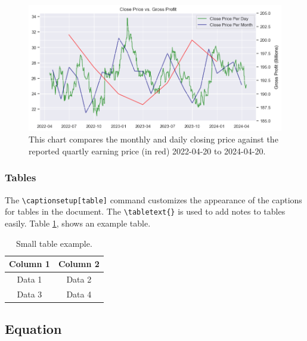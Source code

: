 \documentclass[9pt,a4paper,twoside]{tau}
\begin{document}
            \begin{figure}[H]
                \centering
                \includegraphics[width=0.85\columnwidth]{images/CloseDataVsProfit.png}
                \caption{This chart compares the monthly and daily closing price against the reported quartly earning price (in red) 2022-04-20 to 2024-04-20.}
                \label{fig:figure}
            \end{figure}



        \subsubsection{Tables}
    
            The \verb*|\captionsetup[table]| command customizes the appearance of the captions for tables in the document. The \verb*|\tabletext{}| is used to add notes to tables easily. Table \ref{tab:table}, shows an example table.
            
            \begin{table}[H]
                \centering
                \caption{Small table example.}
    		\label{tab:table}
                \begin{tabular}{cc}
            	\toprule
                    \textbf{Column 1} & \textbf{Column 2} \\
                    \midrule
                    Data 1 & Data 2 \\
                    Data 3 & Data 4 \\
                    \bottomrule
                \end{tabular}
                    
                    
            \end{table}

    \subsection{Equation}
    
\end{document}
